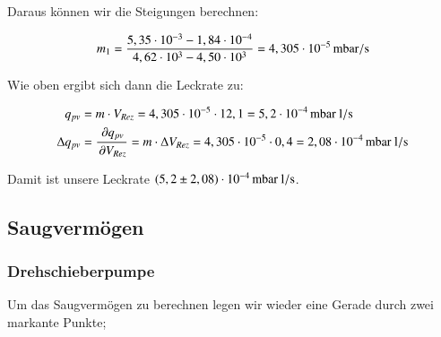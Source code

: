 Daraus können wir die Steigungen berechnen:

\begin{align*}
m_1 &= \frac{5,35 \cdot 10^{-3} - 1,84 \cdot 10^{-4}}{4,62 \cdot 10^{3} - 4,50 \cdot 10^{3}} = \unit[4,305 \cdot 10^{-5}]{mbar/s} \\
\end{align*}

Wie oben ergibt sich dann die Leckrate zu:

\begin{align*}
q_{pv} &= m \cdot V_{Rez} = 4,305 \cdot 10^{-5} \cdot 12,1 = \unit[5,2 \cdot 10^{-4}]{mbar \ l/s} \\
\Delta q_{pv} &= \frac{\p q_{pv}}{\p V_{Rez}} = m \cdot \Delta V_{Rez} = 4,305 \cdot 10^{-5} \cdot 0,4 = \unit[2,08 \cdot 10^{-4}]{mbar \ l/s}
\end{align*}

Damit ist unsere Leckrate $\unit[(5,2 \pm 2,08) \cdot 10^{-4}]{mbar \ l/s}$.




\subsection*{Saugvermögen}

\subsubsection*{Drehschieberpumpe}

Um das Saugvermögen zu berechnen legen wir wieder eine Gerade durch zwei markante Punkte;

\begin{figure}[h]
\end{figure}

